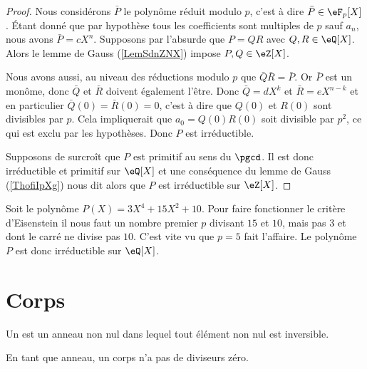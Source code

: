 \begin{proof}
    Nous considérons \( \bar P\) le polynôme réduit modulo \( p\), c'est à dire \( \bar P\in \eF_p[X]\). Étant donné que par hypothèse tous les coefficients sont multiples de \( p\) sauf \( a_n\), nous avons \( \bar P=cX^n\). Supposons par l'absurde que \( P=QR\) avec \( Q,R\in \eQ[X]\). Alors le lemme de Gauss (\ref{LemSdnZNX}) impose \( P,Q\in \eZ[X]\).

    Nous avons aussi, au niveau des réductions modulo \( p\) que $\bar Q\bar R=\bar P$. Or \( \bar P\) est un monôme, donc \( \bar Q\) et \( \bar R\) doivent également l'être. Donc \( \bar Q=dX^k\) et \( \bar R=eX^{n-k}\) et en particulier \( \bar Q(0)=\bar R(0)=0\), c'est à dire que \( Q(0)\) et \( R(0)\) sont divisibles par \( p\). Cela impliquerait que \( a_0=Q(0)R(0)\) soit divisible par \( p^2\), ce qui est exclu par les hypothèses. Donc \( P\) est irréductible.

    Supposons de surcroît que \( P\) est primitif au sens du \( \pgcd\). Il est donc irréductible et primitif sur \( \eQ[X]\) et une conséquence du lemme de Gauss (\ref{ThofiIpXg}) nous dit alors que \( P\) est irréductible sur \( \eZ[X]\).
\end{proof}

\begin{example}
    Soit le polynôme \( P(X)=3X^4+15 X^2+10\). Pour faire fonctionner le critère d'Eisenstein il nous faut un nombre premier \( p\) divisant \( 15\) et \( 10\), mais pas \( 3\) et dont le carré ne divise pas \( 10\). C'est vite vu que \( p=5\) fait l'affaire. Le polynôme \( P\) est donc irréductible sur \( \eQ[X]\).
\end{example}



\section{Corps}

\begin{definition}
    Un  est un anneau non nul dans lequel tout élément non nul est inversible.
\end{definition}

\begin{lemma}       \label{LemAnnCorpsnonInterdivzer}
    En tant que anneau, un corps n'a pas de diviseurs zéro.
\end{lemma}

